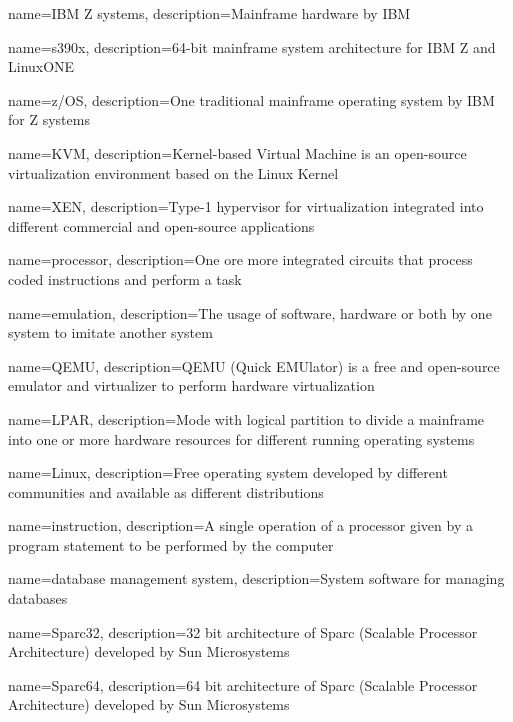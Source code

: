 {
    name={IBM Z systems},
    description={Mainframe hardware by IBM}
}

{
    name={s390x},
    description={64-bit mainframe system architecture for IBM Z and LinuxONE}
}

{
    name={z/OS},
    description={One traditional mainframe operating system by IBM for Z systems}
}

{
    name={KVM},
    description={Kernel-based Virtual Machine is an open-source virtualization environment based on the Linux Kernel}
}

{
    name={XEN},
    description={Type-1 hypervisor for virtualization integrated into different commercial and open-source applications}
}

{
    name={processor},
    description={One ore more integrated circuits that process coded instructions and perform a task}
}

{
    name={emulation},
    description={The usage of software, hardware or both by one system to imitate another system}
}

{
    name={QEMU},
    description={QEMU (Quick EMUlator) is a free and open-source emulator and virtualizer to perform hardware virtualization}
}

{
    name={LPAR},
    description={Mode with logical partition to divide a mainframe into one or more hardware resources for different running operating systems}
}

{
    name={Linux},
    description={Free operating system developed by different communities and available as different distributions}
}

{
    name={instruction},
    description={A single operation of a processor given by a program statement to be performed by the computer}
}

{
    name={database management system},
    description={System software for managing databases}
}

{
    name={Sparc32},
    description={32 bit architecture of Sparc (Scalable Processor Architecture) developed by Sun Microsystems}
}

{
    name={Sparc64},
    description={64 bit architecture of Sparc (Scalable Processor Architecture) developed by Sun Microsystems}
}

